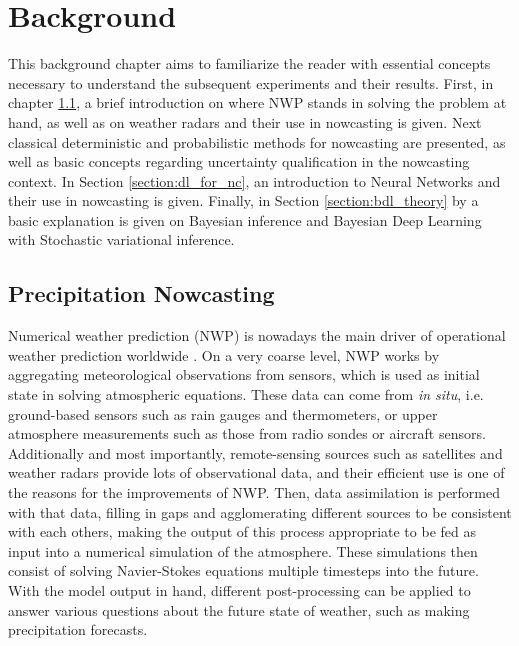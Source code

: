\chapter{Background}
\label{chapter:background} 

This background chapter aims to familiarize the reader with essential concepts necessary to understand the subsequent experiments and their results. First, in chapter \ref{section:precip_nc}, a brief introduction on where NWP stands in solving the problem at hand, as well as on weather radars and their use in nowcasting is given. Next classical deterministic and probabilistic methods for nowcasting are presented, as well as basic concepts regarding uncertainty qualification in the nowcasting context. In Section \ref{section:dl_for_nc}, an introduction to Neural Networks and their use in nowcasting is given. Finally, in Section \ref{section:bdl_theory} by a basic explanation is given on Bayesian inference and Bayesian Deep Learning with Stochastic variational inference. 

\section{Precipitation Nowcasting}
\label{section:precip_nc}


Numerical weather prediction (NWP) is nowadays the main driver of operational weather prediction worldwide \cite{schultz_can_2021, bauer_quiet_2015}. On a very coarse level, NWP works by aggregating meteorological observations from sensors, which is used as initial state in solving atmospheric equations. These data can come from \textit{in situ}, i.e. ground-based sensors such as rain gauges and thermometers, or upper atmosphere measurements such as those from radio sondes or aircraft sensors. Additionally and most importantly, remote-sensing sources such as satellites and weather radars provide lots of observational data, and their efficient use is one of the reasons for the improvements of NWP. Then, data assimilation is performed with that data, filling in gaps and agglomerating different sources to be consistent with each others, making the output of this process appropriate to be fed as input into a numerical simulation of the atmosphere. These simulations then consist of solving Navier-Stokes equations multiple timesteps into the future. With the model output in hand, different post-processing can be applied to answer various questions about the future state of weather, such as making precipitation forecasts.

